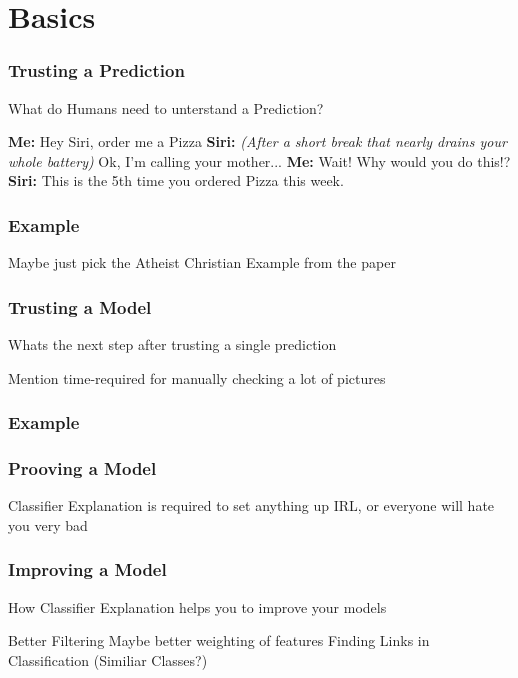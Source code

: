 \section{Basics}

\begin{frame}
	\frametitle{Trusting a Prediction}
	What do Humans need to unterstand a Prediction? \newline
	
	\textbf{Me:} Hey Siri, order me a Pizza \newline
	\textbf{Siri:} \textit{(After a short break that nearly drains your whole battery)} Ok, I'm calling your mother... \newline
	\textbf{Me:} Wait! Why would you do this!? \newline
	\textbf{Siri:} This is the 5th time you ordered Pizza this week. \newline
	
\end{frame}

\begin{frame}
	\frametitle{Example}
	Maybe just pick the Atheist Christian Example from the paper
\end{frame}
\begin{frame}
	\frametitle{Trusting a Model}
	Whats the next step after trusting a single prediction
	
	Mention time-required for manually checking a lot of pictures
\end{frame}
\begin{frame}
	\frametitle{Example}
	
\end{frame}
\begin{frame}
	\frametitle{Prooving a Model}
	Classifier Explanation is required to set anything up IRL, or everyone will hate you very bad
\end{frame}
\begin{frame}
	\frametitle{Improving a Model}
	How Classifier Explanation helps you to improve your models
	
	Better Filtering
	Maybe better weighting of features
	Finding Links in Classification (Similiar Classes?)
\end{frame}